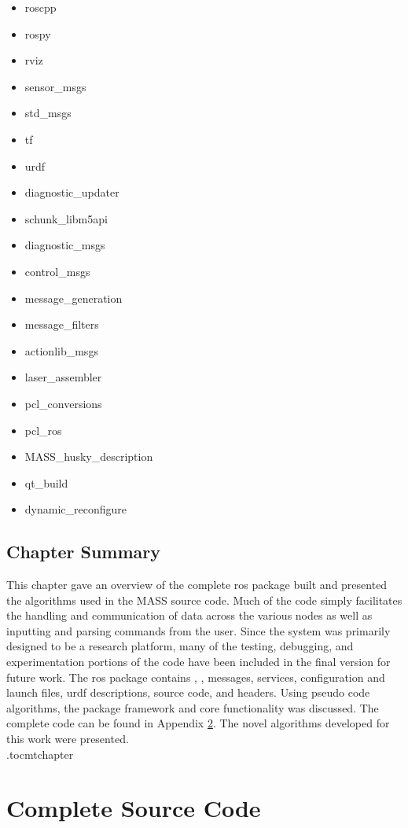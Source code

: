 \begin{itemize}
\item roscpp
\item rospy
\item rviz
\item sensor\_msgs
\item std\_msgs
\item tf
\item urdf 
\item diagnostic\_updater
\item schunk\_libm5api
\item diagnostic\_msgs
\item control\_msgs
\item message\_generation
\item message\_filters
\item actionlib\_msgs
\item laser\_assembler
\item pcl\_conversions 
\item pcl\_ros 
\item MASS\_husky\_description
\item qt\_build
\item dynamic\_reconfigure
\end{itemize}

\section{Chapter Summary}
This chapter gave an overview of the complete \acrshort{ros} package built and presented the algorithms used in the MASS source code. Much of the code simply facilitates the handling and communication of data across the various nodes as well as inputting and parsing commands from the user. Since the system was primarily designed to be a research platform, many of the testing, debugging, and experimentation portions of the code have been included in the final version for future work. The \acrshort{ros} package contains , , messages, services, configuration and launch files, \acrshort{urdf} descriptions, source code, and headers. Using pseudo code algorithms, the package framework and core functionality was discussed. The complete code can be found in Appendix \ref{app:code}. The novel algorithms developed for this work were presented.\\
\etocdepthtag.toc{mtchapter}
\chapter{Complete Source Code}
\label{app:code}
